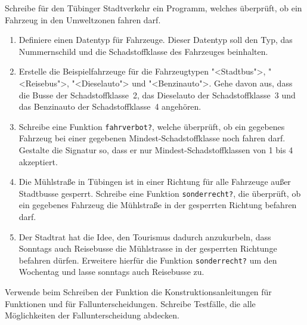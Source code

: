 \begin{aufgabe}

  Schreibe für den Tübinger Stadtverkehr ein
  Programm, welches überprüft, ob ein Fahrzeug in den Umweltzonen fahren 
  darf.
  \begin{enumerate}
  \item Definiere einen Datentyp für Fahrzeuge. Dieser
    Datentyp soll den Typ, das Nummernschild und die Schadstoffklasse des
    Fahrzeuges beinhalten.
  \item Erstelle die Beispielfahrzeuge für die
    Fahrzeugtypen "<Stadtbus">, "<Reisebus">, "<Dieselauto">
    und "<Benzinauto">. Gehe davon aus, dass die Busse der
    Schadstoffklasse~2, das Dieselauto der Schadstoffklasse~3 und das
    Benzinauto der Schadstoffklasse~4 angehören.
  \item Schreibe eine Funktion \lstinline{fahrverbot?},
    welche überprüft, ob ein gegebenes Fahrzeug bei einer gegebenen
    Mindest-Schadstoffklasse noch fahren darf. Gestalte die Signatur
    so, dass er nur Mindest-Schadstoffklassen von 1 bis 4 akzeptiert.
  \item Die Mühlstraße in Tübingen ist in einer Richtung für
    alle Fahrzeuge außer Stadtbusse gesperrt. Schreibe eine Funktion
    \lstinline{sonderrecht?}, die überprüft, ob ein gegebenes Fahrzeug die
    Mühlstraße in der gesperrten Richtung befahren darf.  
  \item Der Stadtrat hat die Idee, den Tourismus
    dadurch anzukurbeln, dass Sonntags auch Reisebusse die Mühlstrasse in
    der gesperrten Richtunge befahren dürfen. Erweitere hierfür die
    Funktion \lstinline{sonderrecht?} um den Wochentag und lasse sonntags
    auch Reisebusse zu.
  \end{enumerate}
  Verwende beim Schreiben der Funktion die
  Konstruktionsanleitungen für Funktionen und für Fallunterscheidungen. 
  Schreibe Testfälle, die alle Möglichkeiten der   
  Fallunterscheidung abdecken.
  
\end{aufgabe}

